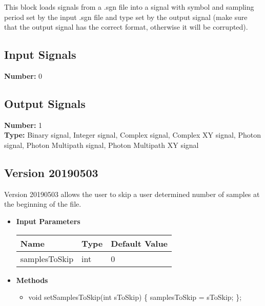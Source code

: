 This block loads signals from a .sgn file into a signal with symbol and sampling period set by the input .sgn file and type set by the output signal (make sure that the output signal has the correct format, otherwise it will be corrupted).

\subsection*{Input Signals}

\textbf{Number:} 0

\subsection*{Output Signals}

\textbf{Number:} 1\\
\textbf{Type:} Binary signal, Integer signal, Complex signal, Complex XY signal, Photon signal,  Photon Multipath signal,  Photon Multipath XY signal

\subsection*{Version 20190503}

Version 20190503 allows the user to skip a user determined number of samples at the beginning of the file.

\begin{itemize}
  \item \textbf{Input Parameters}
  \begin{table}[H]
    \centering
    \begin{tabular}{|l|l|l|}
    \hline
    Name           & Type           & Default Value     \\ \hline
    samplesToSkip     & int  & 0 \\ \hline
    \end{tabular}
  \end{table}

  \item \textbf{Methods}
  \begin{itemize}
    \item void setSamplesToSkip(int sToSkip) \{ samplesToSkip = sToSkip; \};
  \end{itemize}
\end{itemize}
